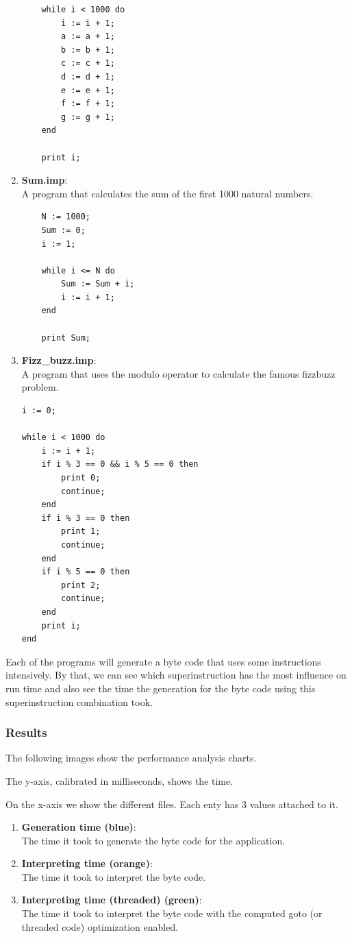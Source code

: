 \documentclass{article}
\begin{document}
\begin{enumerate}
\begin{verbatim}
    while i < 1000 do
        i := i + 1;
        a := a + 1;
        b := b + 1;
        c := c + 1;
        d := d + 1;
        e := e + 1;
        f := f + 1;
        g := g + 1;
    end

    print i;
\end{verbatim}

    \item \textbf{Sum.imp}:\\
    \label{item:inc_loop}
    A program that calculates the sum of the first 1000 natural numbers.
\begin{verbatim}
    N := 1000;
    Sum := 0;
    i := 1;

    while i <= N do
        Sum := Sum + i;
        i := i + 1;
    end

    print Sum;
\end{verbatim}
    \item \textbf{Fizz\_buzz.imp}:\\
    A program that uses the modulo operator to calculate the famous fizzbuzz problem.
\begin{verbatim}
i := 0;

while i < 1000 do
    i := i + 1;
    if i % 3 == 0 && i % 5 == 0 then
        print 0;
        continue;
    end
    if i % 3 == 0 then
        print 1;
        continue;
    end
    if i % 5 == 0 then
        print 2;
        continue;
    end
    print i;
end
\end{verbatim}
\end{enumerate}

Each of the programs will generate a byte code that uses some instructions
intensively. By that, we can see which superinstruction has the most influence on
run time and also see the time the generation for the byte code using this
superinstruction combination took.

\subsubsection{Results}
The following images show the performance analysis charts.

The y-axis, calibrated in milliseconds, shows the time.

On the x-axis we show the different files. Each enty has 3 values attached to it.

\begin{enumerate}
    \item \textbf{Generation time (blue)}:\\
        The time it took to generate the byte code for the application.
    \item \textbf{Interpreting time (orange)}:\\
        The time it took to interpret the byte code.
    \item \textbf{Interpreting time (threaded) (green)}:\\
        The time it took to interpret the byte code with the computed goto (or
        threaded code) optimization enabled.
\end{enumerate}
\end{document}

